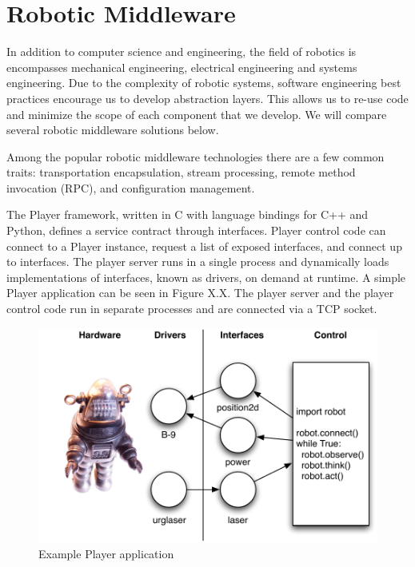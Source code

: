 \chapter{Robotic Middleware}

In addition to computer science and engineering, the field of robotics is encompasses mechanical engineering, electrical engineering and systems engineering. Due to the complexity of robotic systems, software engineering best practices encourage us to develop abstraction layers. This allows us to re-use code and minimize the scope of each component that we develop. We will compare several robotic middleware solutions below.

Among the popular robotic middleware technologies there are a few common traits: transportation encapsulation, stream processing, remote method invocation (RPC), and configuration management.

The Player framework, written in C with language bindings for C++ and Python, defines a service contract through interfaces. Player control code can connect to a Player instance, request a list of exposed interfaces, and connect up to interfaces. The player server runs in a single process and dynamically loads implementations of interfaces, known as drivers, on demand at runtime. A simple Player application can be seen in Figure X.X. The player server and the player control code run in separate processes and are connected via a TCP socket.

\begin{figure}[ht]
\includegraphics{images/middleware-player.pdf}
\caption{Example Player application}
\end{figure}



